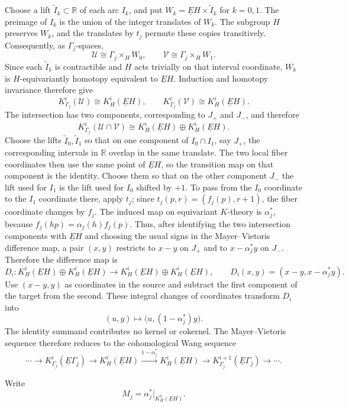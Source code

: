 \documentclass[11pt]{amsart}
\newcommand{\R}{\mathbb R}
\newcommand{\KC}[2]{K^{#1}_{#2}(\underline E#2)}
\theoremstyle{remark}
\numberwithin{equation}{section}
\begin{document}
Choose a lift $\widetilde I_k\subset\R$ of each arc $I_k$, and put
$W_k=\underline EH\times\widetilde I_k$ for $k=0,1$. The preimage of
$I_k$ is the union of the integer translates of $W_k$. The subgroup
$H$ preserves $W_k$, and the translates by $t_j$ permute these copies
transitively. Consequently, as $\Gamma_j$-spaces,
\[
 \mathcal U\cong\Gamma_j\times_H W_0,\qquad
 \mathcal V\cong\Gamma_j\times_H W_1.
\]
Since each $\widetilde I_k$ is contractible and $H$ acts trivially on
that interval coordinate, $W_k$ is $H$-equivariantly homotopy equivalent
to $\underline EH$. Induction and homotopy invariance therefore give
\[
 K_{\Gamma_j}^i(\mathcal U)\cong\KC{i}{H},\qquad
 K_{\Gamma_j}^i(\mathcal V)\cong\KC{i}{H}.
\]
The intersection has two components, corresponding to $J_+$ and
$J_-$, and therefore
\[
 K_{\Gamma_j}^i(\mathcal U\cap\mathcal V)
 \cong\KC{i}{H}\oplus\KC{i}{H}.
\]
Choose the lifts $\widetilde I_0,\widetilde I_1$ so that on one
component of $I_0\cap I_1$, say $J_+$, the corresponding intervals in
$\R$ overlap in the same translate. The two local fiber coordinates
then use the same point of $\underline EH$, so the transition map on
that component is the identity. Choose them so that on the other
component $J_-$ the lift used for $I_1$ is the lift used for $I_0$
shifted by $+1$. To pass from the $I_0$ coordinate to the $I_1$
coordinate there, apply $t_j$; since
$t_j(p,r)=(f_j(p),r+1)$, the fiber coordinate changes by $f_j$. The induced map
on equivariant $K$-theory is $\alpha_j^*$, because
$f_j(hp)=\alpha_j(h)f_j(p)$. Thus, after identifying the two
intersection components with $\underline EH$ and choosing the usual
signs in the Mayer--Vietoris difference map, a pair $(x,y)$ restricts
to $x-y$ on $J_+$ and to $x-\alpha_j^*y$ on $J_-$. Therefore the
difference map is
\begin{equation*}
 D_i\colon\KC{i}{H}\oplus\KC{i}{H}
 \longrightarrow\KC{i}{H}\oplus\KC{i}{H},
 \qquad
 D_i(x,y)=(x-y,x-\alpha_j^*y).
\end{equation*}
Use $(x-y,y)$ as coordinates in the source and subtract the first
component of the target from the second. These integral changes of coordinates transform $D_i$ into
\[
 (u,y)\longmapsto\bigl(u,(1-\alpha_j^*)y\bigr).
\]
The identity summand contributes no kernel or cokernel. The Mayer--Vietoris sequence therefore reduces to the cohomological Wang sequence
\[
 \cdots\longrightarrow\KC{i}{\Gamma_j}
 \longrightarrow\KC{i}{H}
 \xrightarrow{1-\alpha_j^*}\KC{i}{H}
 \longrightarrow\KC{i+1}{\Gamma_j}\longrightarrow\cdots.
\]

Write
\[
 M_j=\alpha_j^*\big|_{\KC{0}{H}}.
\]
\end{document}
